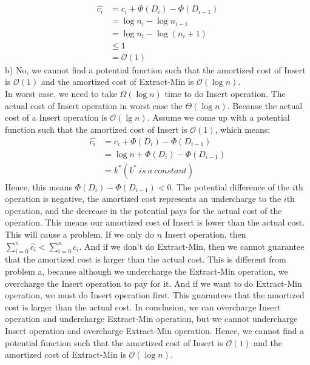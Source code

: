 \documentclass[12pt,letterpaper]{article}
\begin{document}
\begin{align*}
\widehat{c_i} &= c_i + \Phi(D_i) - \Phi(D_{i-1}) \\
&= \log n_i - \log n_{i-1} \\
&= \log n_i - \log (n_i + 1) \\
&\le 1 \\
&= \mathcal{O}(1)
\end{align*}
b) No, we cannot find a potential function such that the amortized cost of Insert is $\mathcal{O}(1)$ and the amortized cost of Extract-Min is $\mathcal{O}(\log n)$. \\ In worst case, we need to take $\Omega(\log n)$ time to do Insert operation. The actual cost of Insert operation in worst case the $\Theta(\log n)$. Because the actual cost of a Insert operation is $\mathcal{O}(\lg n)$. Assume we come up with a potential function such that the amortized cost of Insert is $\mathcal{O}(1)$, which means: 
\begin{align*}
\widehat{c_i} &= c_i + \Phi(D_i) - \Phi(D_{i-1}) \\
&= \log n + \Phi(D_i) - \Phi(D_{i-1}) \\
&= k^* (k^*\ is\ a\ constant)
\end{align*}
Hence, this means $\Phi(D_i) - \Phi(D_{i-1}) < 0$. The potential difference of the $i$th operation is negative, the amortized cost represents an undercharge to the $i$th operation, and the decrease in the potential pays for the actual cost of the operation. This means our amortized cost of Insert is lower than the actual cost. This will cause a problem. If we only do $n$ Insert operation, then $\sum _{i = 0} ^{n} \widehat{c_i} < \sum _{i = 0} ^{n} c_i $. And if we don't do Extract-Min, then we cannot guarantee that the amortized cost is larger than the actual cost. This is different from problem a, because although we undercharge the Extract-Min operation, we overcharge the Insert operation to pay for it. And if we want to do Extract-Min operation, we must do Insert operation first. This guarantees that the amortized cost is larger than the actual cost. In conclusion, we can overcharge Insert operation and undercharge Extract-Min operation, but we cannot undercharge Insert operation and overcharge Extract-Min operation. Hence, we cannot find a potential function such that the amortized cost of Insert is $\mathcal{O}(1)$ and the amortized cost of Extract-Min is $\mathcal{O}(\log n)$. 
\end{document}
